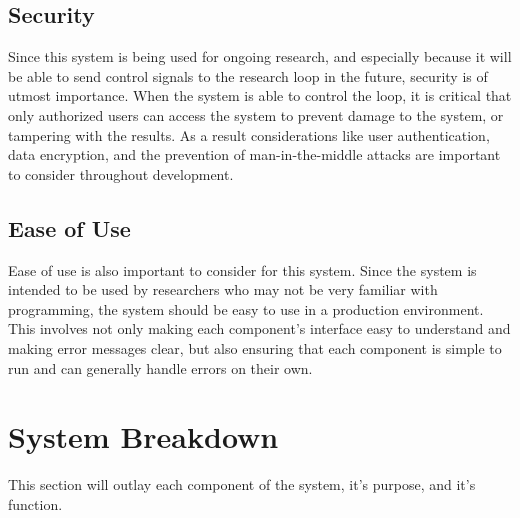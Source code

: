 \documentclass[10pt,technote]{IEEEtran}
\begin{document}
\subsection{Security}
Since this system is being used for ongoing research, and especially because it will be able to send control signals to the research loop in the future, security is of utmost importance. When the system is able to control the loop, it is critical that only authorized users can access the system to prevent damage to the system, or tampering with the results. As a result considerations like user authentication, data encryption, and the prevention of man-in-the-middle attacks are important to consider throughout development.
\subsection{Ease of Use}
Ease of use is also important to consider for this system. Since the system is intended to be used by researchers who may not be very familiar with programming, the system should be easy to use in a production environment. This involves not only making each component's interface easy to understand and making error messages clear, but also ensuring that each component is simple to run and can generally handle errors on their own. 
\section{System Breakdown}
This section will outlay each component of the system, it's purpose, and it's function.
\end{document}
